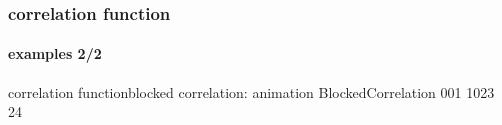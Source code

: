 \begin{frame}\frametitle{correlation function}\framesubtitle{examples 2/2}
\end{frame}

%
\begin{frame}{correlation function}{blocked correlation: animation}
        {BlockedCorrelation}
        {001}
        {1023}
        {24}
\end{frame}	 

